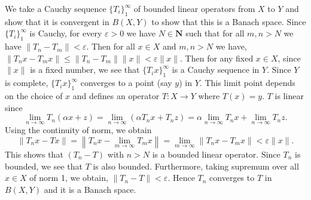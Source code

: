 \documentclass[12pt]{article}
\begin{document}
\begin{enumerate}
\begin{mybox}
    \vspace*{2mm}
    We take a Cauchy sequence $\{T_i\}_1^\infty$ of
    bounded linear operators from $X$ to $Y$ and show that
    it is convergent in $B(X,Y)$ to show that this is a
    Banach space. Since $\{T_i\}_1^\infty$ is Cauchy, for
    every $\varepsilon>0$ we have $N\in\mathbf{N}$ such
    that for all $m,n>N$ we have $\|T_n-T_m\|<\varepsilon$.
    Then for all $x\in X$ and $m,n>N$ we have,
    $\|T_nx-T_mx\|\leq \|T_n-T_m\|\|x\|<\varepsilon\|x\|$.
    Then for any fixed $x\in X$, since $\|x\|$ is a fixed
    number, we see that $\{T_ix\}_1^\infty$ is a Cauchy
    sequence in $Y$. Since $Y$ is complete,
    $\{T_ix\}_1^\infty$ converges to a point (say $y$)
    in $Y$. This limit point depends on the choice of
    $x$ and defines an operator $T:X\to Y$ where $T(x)=y$.
    $T$ is linear since
    $$\lim_{n\to\infty} T_n(\alpha x+z)=\lim_{n\to\infty}
    (\alpha T_nx+T_nz)
    =\alpha\lim_{n\to\infty}T_nx+\lim_{n\to\infty} T_nz.$$
    Using the continuity of norm, we obtain
    $$\left\|T_nx-Tx\right\|=
    \left\|T_nx-\lim_{m\to\infty}{T_mx}\right\|
    =\lim_{m\to\infty}{\|T_nx-T_mx\|}<\varepsilon\|x\|.$$
    This shows that $(T_n-T)$ with $n>N$ is a bounded linear
    operator. Since $T_n$ is bounded, we see that $T$ is also
    bounded. Furthermore, taking supremum over all $x\in X$
    of norm 1, we obtain, $\|T_n-T\|<\varepsilon.$
    Hence $T_n$ converges to $T$ in $B(X,Y)$ and it is a
    Banach space.
\end{mybox}

\end{enumerate}
\end{document}
